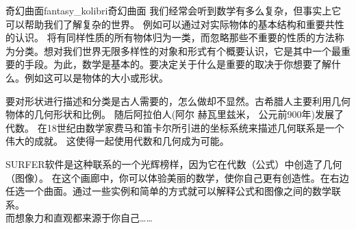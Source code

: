 ﻿\begin{surferIntroPage}{奇幻曲面}{fantasy_kolibri}{奇幻曲面}
我们经常会听到数学有多么复杂，但事实上它可以帮助我们了解复杂的世界。 例如可以通过对实际物体的基本结构和重要共性的认识。 将有同样性质的所有物体归为一类，而忽略那些不重要的性质的方法称为分类。想对我们世界无限多样性的对象和形式有个概要认识，它是其中一个最重要的手段。为此，数学是基本的。要决定关于什么是重要的取决于你想要了解什么。例如这可以是物体的大小或形状。\\

\vspace{0.4cm}


要对形状进行描述和分类是古人需要的，怎么做却不显然。古希腊人主要利用几何物体的几何形状和比例。 随后阿拉伯人(阿尔 赫瓦里兹米， 公元前900年)发展了代数。 在18世纪由数学家费马和笛卡尔所引进的坐标系统来描述几何联系是一个伟大的成就。 这使得一起使用代数和几何成为可能。\\

\vspace{0.4cm}

SURFER软件是这种联系的一个光辉榜样，因为它在代数（公式）中创造了几何（图像）。
在这个画廊中，你可以体验美丽的数学，使你自己更有创造性。在右边任选一个曲面。通过一些实例和简单的方式就可以解释公式和图像之间的数学联系。\\
而想象力和直观都来源于你自己……
\end{surferIntroPage}
